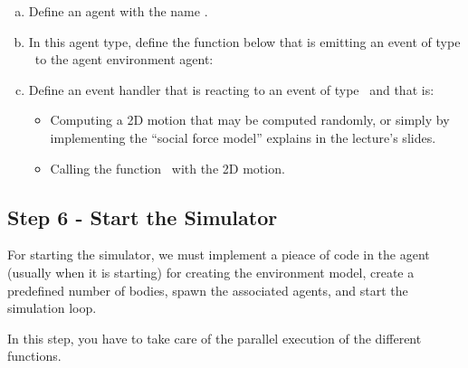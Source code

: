 \documentclass[english,nodocumentinfo,nopubpage]{utbmciadreport}
\begin{document}
\begin{enumerate}[a)]
\item Define an agent with the name .
\item In this agent type, define the function below that is emitting an event of type \ to the agent environment agent:
	\begin{center}
	\end{center}
\item Define an event handler that is reacting to an event of type \ and that is:
	\begin{itemize}
	\item Computing a 2D motion that may be computed randomly, or simply by implementing the ``social force model'' explains in the lecture's slides.
	\item Calling the function \ with the 2D motion.
	\end{itemize}
\end{enumerate}


\subsection{Step 6 - Start the Simulator}


For starting the simulator, we must implement a pieace of code in the agent  (usually when it is starting) for creating the environment model, create a predefined number of bodies, spawn the associated agents, and start the simulation loop.

In this step, you have to take care of the parallel execution of the different functions.
\end{document}
